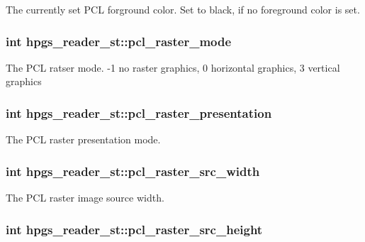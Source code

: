 The currently set PCL forground color. Set to black, if no foreground color is set. 
\subsubsection[pcl\_\-raster\_\-mode]{\setlength{\rightskip}{0pt plus 5cm}int {\bf hpgs\_\-reader\_\-st::pcl\_\-raster\_\-mode}}\label{structhpgs__reader__st_94717a915f04e38ccf6954f79a0aed76}


The PCL ratser mode. -1 no raster graphics, 0 horizontal graphics, 3 vertical graphics 
\subsubsection[pcl\_\-raster\_\-presentation]{\setlength{\rightskip}{0pt plus 5cm}int {\bf hpgs\_\-reader\_\-st::pcl\_\-raster\_\-presentation}}\label{structhpgs__reader__st_a719fff507257e35bb1d8a75e5ad1547}


The PCL raster presentation mode. 
\subsubsection[pcl\_\-raster\_\-src\_\-width]{\setlength{\rightskip}{0pt plus 5cm}int {\bf hpgs\_\-reader\_\-st::pcl\_\-raster\_\-src\_\-width}}\label{structhpgs__reader__st_2c2def9afb39268366d8dd182ceeda4c}


The PCL raster image source width. 
\subsubsection[pcl\_\-raster\_\-src\_\-height]{\setlength{\rightskip}{0pt plus 5cm}int {\bf hpgs\_\-reader\_\-st::pcl\_\-raster\_\-src\_\-height}}\label{structhpgs__reader__st_d2526b16d2f3cd3a61def01e3723abbe}


